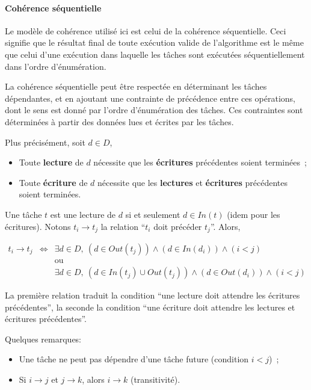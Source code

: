 \documentclass[11pt]{article}
\theoremstyle{plain} %
\theoremstyle{definition} %
\begin{document}
\paragraph{Cohérence séquentielle}
\label{sec:cons-sequ}
Le modèle de cohérence utilisé ici est celui de la cohérence séquentielle.
Ceci signifie que le résultat final de toute exécution valide de l'algorithme est le même que celui d'une exécution dans laquelle les tâches sont exécutées séquentiellement dans l'ordre d'énumération.

La cohérence séquentielle peut être respectée en déterminant les tâches dépendantes, et en ajoutant une contrainte de précédence entre ces opérations, dont le sens est donné par l'ordre d'énumération des tâches.
Ces contraintes sont déterminées à partir des données lues et écrites par les tâches.

Plus précisément, soit $d \in D$,
\begin{itemize}
\item Toute \textbf{lecture} de $d$ nécessite que les \textbf{écritures} précédentes soient terminées~;
\item Toute \textbf{écriture} de $d$ nécessite que les \textbf{lectures} et \textbf{écritures} précédentes soient terminées.
\end{itemize}

Une tâche $t$ est une lecture de $d$ si et seulement $d \in In(t)$ (idem pour les écritures).
Notons $t_i \to t_j$ la relation ``$t_i$ doit précéder $t_j$''.
Alors,

\begin{equation}
  \label{eq:aretes-graphe-taches}
  \begin{array}{ccl}
    t_i \to t_j & \Longleftrightarrow & \exists d \in D,\ (d \in Out(t_{j})) \wedge (d \in In(d_i)) \wedge (i < j) \\
    & & \text{ou} \\
    & & \exists d \in D,\ (d \in In(t_{j}) \cup Out(t_{j})) \wedge (d \in Out(d_i)) \wedge (i < j)
  \end{array}
\end{equation}

La première relation traduit la condition ``une lecture doit attendre les écritures précédentes'', la seconde la condition ``une écriture doit attendre les lectures et écritures précédentes''.

Quelques remarques:
\begin{itemize}
\item Une tâche ne peut pas dépendre d'une tâche future (condition $i < j$)~;
\item Si $i \to j$ et $j \to k$, alors $i \to k$ (transitivité).
\end{itemize}
\end{document}
